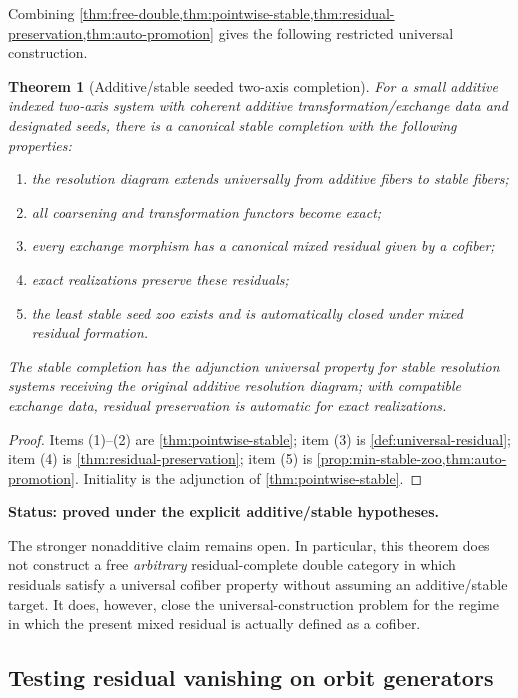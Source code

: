 \documentclass[11pt]{article}
\newtheorem{theorem}{Theorem}[section]
\theoremstyle{definition}
\theoremstyle{remark}
\newcommand{\status}[1]{\textbf{Status: #1.}}
\begin{document}
Combining \cref{thm:free-double,thm:pointwise-stable,thm:residual-preservation,thm:auto-promotion} gives the following restricted universal construction.

\begin{theorem}[Additive/stable seeded two-axis completion]\label{thm:additive-stable-completion}
For a small additive indexed two-axis system with coherent additive transformation/exchange data and designated seeds, there is a canonical stable completion with the following properties:
\begin{enumerate}
    \item the resolution diagram extends universally from additive fibers to stable fibers;
    \item all coarsening and transformation functors become exact;
    \item every exchange morphism has a canonical mixed residual given by a cofiber;
    \item exact realizations preserve these residuals;
    \item the least stable seed zoo exists and is automatically closed under mixed residual formation.
\end{enumerate}
The stable completion has the adjunction universal property for stable resolution systems receiving the original additive resolution diagram; with compatible exchange data, residual preservation is automatic for exact realizations.
\end{theorem}

\begin{proof}
Items (1)--(2) are \cref{thm:pointwise-stable}; item (3) is \cref{def:universal-residual}; item (4) is \cref{thm:residual-preservation}; item (5) is \cref{prop:min-stable-zoo,thm:auto-promotion}. Initiality is the adjunction of \cref{thm:pointwise-stable}.
\end{proof}

\status{proved under the explicit additive/stable hypotheses}

The stronger nonadditive claim remains open. In particular, this theorem does not construct a free \emph{arbitrary} residual-complete double category in which residuals satisfy a universal cofiber property without assuming an additive/stable target. It does, however, close the universal-construction problem for the regime in which the present mixed residual is actually defined as a cofiber.


\subsection{Testing residual vanishing on orbit generators}
\end{document}
